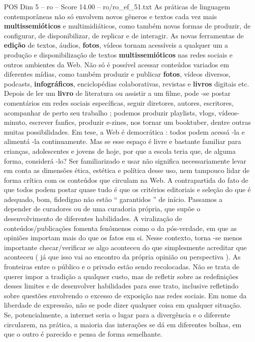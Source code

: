 \begin{textsample}{POS Dim 5 – ro – Score 14.00 – ro/ro\_ef\_51.txt}
As práticas de linguagem contemporâneas não só envolvem novos gêneros e textos cada vez mais \textbf{multissemióticos} e multimidiáticos, como também novas formas de produzir, de configurar, de disponibilizar, de replicar e de interagir.
As novas ferramentas de \textbf{edição} de textos, áudios, \textbf{fotos}, vídeos tornam acessíveis a qualquer um a produção e disponibilização de textos \textbf{multissemióticos} nas redes sociais e outros ambientes da Web.
Não só é possível acessar conteúdos variados em diferentes mídias, como também produzir e publicar \textbf{fotos}, vídeos diversos, podcasts, \textbf{infográficos}, enciclopédias colaborativas, revistas e \textbf{livros} digitais etc.
Depois de ler um \textbf{livro} de literatura ou assistir a um filme, pode -se postar comentários em redes sociais específicas, seguir diretores, autores, escritores, acompanhar de perto seu trabalho ; podemos produzir playlists, vlogs, vídeos-minuto, escrever fanfics, produzir e-zines, nos tornar um booktuber, dentre outras muitas possibilidades.
Em tese, a Web é democrática : todos podem acessá -la e alimentá -la continuamente.
Mas se esse espaço é livre e bastante familiar para crianças, adolescentes e jovens de hoje, por que a escola teria que, de alguma forma, considerá -lo?
Ser familiarizado e usar não significa necessariamente levar em conta as dimensões ética, estética e política desse uso, nem tampouco lidar de forma crítica com os conteúdos que circulam na Web.
A contrapartida do fato de que todos podem postar quase tudo é que os critérios editoriais e seleção do que é adequado, bom, fidedigno não estão “ garantidos ” de início.
Passamos a depender de curadores ou de uma curadoria própria, que supõe o desenvolvimento de diferentes habilidades.
A viralização de conteúdos/publicações fomenta fenômenos como o da pós-verdade, em que as opiniões importam mais do que os fatos em si.
Nesse contexto, torna -se menos importante checar/verificar se algo aconteceu do que simplesmente acreditar que aconteceu ( já que isso vai ao encontro da própria opinião ou perspectiva ).
As fronteiras entre o público e o privado estão sendo recolocadas.
Não se trata de querer impor a tradição a qualquer custo, mas de refletir sobre as redefinições desses limites e de desenvolver habilidades para esse trato, inclusive refletindo sobre questões envolvendo o excesso de exposição nas redes sociais.
Em nome da liberdade de expressão, não se pode dizer qualquer coisa em qualquer situação.
Se, potencialmente, a internet seria o lugar para a divergência e o diferente circularem, na prática, a maioria das interações se dá em diferentes bolhas, em que o outro é parecido e pensa de forma semelhante.

\end{textsample}

